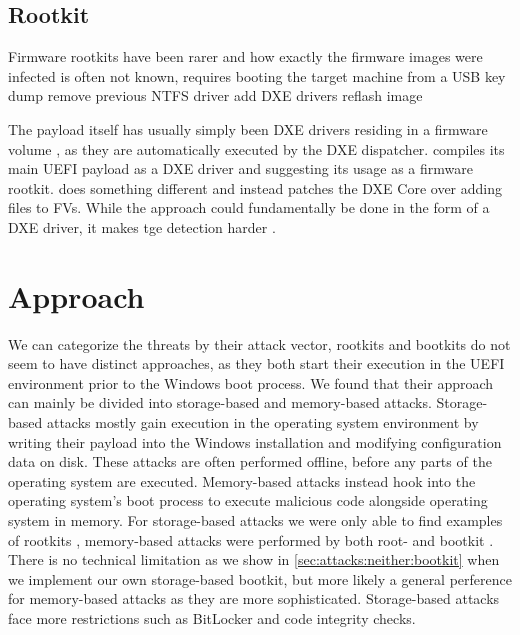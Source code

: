\subsection{Rootkit}


Firmware rootkits have been rarer and how exactly the firmware images were infected is often not known,
\cite{vector-edk} requires booting the target machine from a USB key \cite{mosaicregressor}
 \cite{lojax}
dump
remove previous NTFS driver
add DXE drivers
reflash image

The payload itself has usually simply been \ac{DXE} drivers residing in a firmware volume \cite{mosaicregressor,lojax}, as they are automatically executed by the \ac{DXE} dispatcher. \cite{efiguard} compiles its main \ac{UEFI} payload as a \ac{DXE} driver and suggesting its usage as a firmware rootkit. \cite{moonbounce} does something different and instead patches the \ac{DXE} Core over adding files to \acp{FV}. While the approach could fundamentally be done in the form of a \ac{DXE} driver, it makes tge detection harder \cite{moonbounce}.

\section{Approach}

We can categorize the threats by their attack vector, rootkits and bootkits do not seem to have distinct approaches, as they both start their execution in the \ac{UEFI} environment prior to the Windows boot process. We found that their approach can mainly be divided into storage-based and memory-based attacks. Storage-based attacks mostly gain execution in the operating system  environment by writing their payload into the Windows installation and modifying configuration data on disk. These attacks are often performed offline, before any parts of the operating system are executed. Memory-based attacks instead hook into the operating system's boot process to execute malicious code alongside operating system in memory. For storage-based attacks we were only able to find examples of rootkits \cite{vector-edk,mosaicregressor,lojax}, memory-based attacks were performed by both root- and bootkit \cite{dreamboot,efiguard,especter,finspy,moonbounce,cosmicstrand}.
There is no technical limitation as we show in \autoref{sec:attacks:neither:bootkit} when we implement our own storage-based bootkit, but more likely a general perference for memory-based attacks as they are more sophisticated. Storage-based attacks face more restrictions such as BitLocker and code integrity checks.

